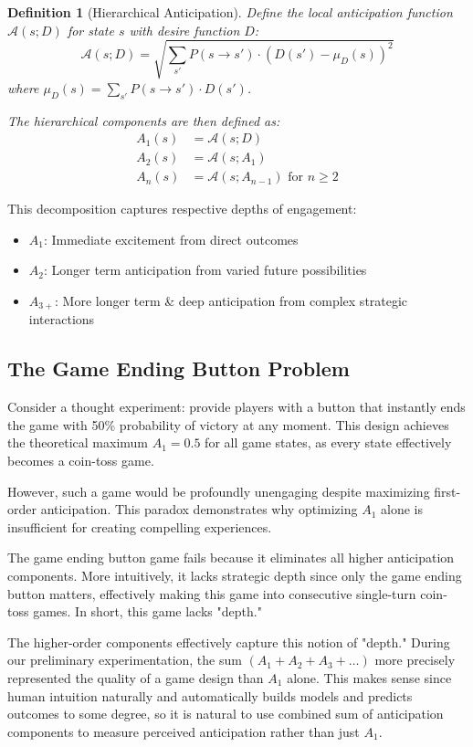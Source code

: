 \documentclass{article}
\newtheorem{definition}{Definition}
\begin{document}
\begin{definition}[Hierarchical Anticipation]
Define the local anticipation function $\mathcal{A}(s; D)$ for state $s$ with desire function $D$:
\begin{equation}
\mathcal{A}(s; D) = \sqrt{\sum_{s'} P(s \to s') \cdot (D(s') - \mu_D(s))^2}
\end{equation}
where $\mu_D(s) = \sum_{s'} P(s \to s') \cdot D(s')$.

The hierarchical components are then defined as:
\begin{align}
A_1(s) &= \mathcal{A}(s; D) \\
A_2(s) &= \mathcal{A}(s; A_1) \\
A_n(s) &= \mathcal{A}(s; A_{n-1}) \text{ for } n \geq 2
\end{align}
\end{definition}

This decomposition captures respective depths of engagement:
\begin{itemize}
\item $A_1$: Immediate excitement from direct outcomes
\item $A_2$: Longer term anticipation from varied future possibilities
\item $A_{3+}$: More longer term \& deep anticipation from complex strategic interactions
\end{itemize}

\subsection{The Game Ending Button Problem}

Consider a thought experiment: provide players with a button that instantly ends the game with 50\% probability of victory at any moment. This design achieves the theoretical maximum $A_1 = 0.5$ for all game states, as every state effectively becomes a coin-toss game.

However, such a game would be profoundly unengaging despite maximizing first-order anticipation. This paradox demonstrates why optimizing $A_1$ alone is insufficient for creating compelling experiences.

The game ending button game fails because it eliminates all higher anticipation components. More intuitively, it lacks strategic depth since only the game ending button matters, effectively making this game into consecutive single-turn coin-toss games. In short, this game lacks "depth."

The higher-order components effectively capture this notion of "depth." During our preliminary experimentation, the sum $(A_1 + A_2 + A_3 + \ldots)$ more precisely represented the quality of a game design than $A_1$ alone. This makes sense since human intuition naturally and automatically builds models and predicts outcomes to some degree, so it is natural to use combined sum of anticipation components to measure perceived anticipation rather than just $A_1$.
\end{document}
